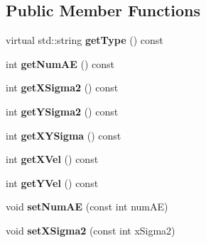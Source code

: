 \subsection*{Public Member Functions}
\begin{DoxyCompactItemize}
\item 
virtual std\+::string {\bfseries get\+Type} () const \hypertarget{classev_1_1ClusterEventGauss_a1df2453e17843cfce7d83fcb18f6dd0f}{}\label{classev_1_1ClusterEventGauss_a1df2453e17843cfce7d83fcb18f6dd0f}

\item 
int {\bfseries get\+Num\+AE} () const \hypertarget{classev_1_1ClusterEventGauss_a3e2d06634450fb40294c6c826d88dad6}{}\label{classev_1_1ClusterEventGauss_a3e2d06634450fb40294c6c826d88dad6}

\item 
int {\bfseries get\+X\+Sigma2} () const \hypertarget{classev_1_1ClusterEventGauss_aa4898a9304cbf6ed5c3d8883473e9fbf}{}\label{classev_1_1ClusterEventGauss_aa4898a9304cbf6ed5c3d8883473e9fbf}

\item 
int {\bfseries get\+Y\+Sigma2} () const \hypertarget{classev_1_1ClusterEventGauss_ade45d25fe8cd39623bb5f330ae012e6e}{}\label{classev_1_1ClusterEventGauss_ade45d25fe8cd39623bb5f330ae012e6e}

\item 
int {\bfseries get\+X\+Y\+Sigma} () const \hypertarget{classev_1_1ClusterEventGauss_a267d0eb2a46834de84dadd274a08521f}{}\label{classev_1_1ClusterEventGauss_a267d0eb2a46834de84dadd274a08521f}

\item 
int {\bfseries get\+X\+Vel} () const \hypertarget{classev_1_1ClusterEventGauss_a6278b2c5095948a499cb59aa07d79ab0}{}\label{classev_1_1ClusterEventGauss_a6278b2c5095948a499cb59aa07d79ab0}

\item 
int {\bfseries get\+Y\+Vel} () const \hypertarget{classev_1_1ClusterEventGauss_a94dde2e9f7356331e3694b736f8984c7}{}\label{classev_1_1ClusterEventGauss_a94dde2e9f7356331e3694b736f8984c7}

\item 
void {\bfseries set\+Num\+AE} (const int num\+AE)\hypertarget{classev_1_1ClusterEventGauss_a4435e1378dc1431b812917ce0fd78930}{}\label{classev_1_1ClusterEventGauss_a4435e1378dc1431b812917ce0fd78930}

\item 
void {\bfseries set\+X\+Sigma2} (const int x\+Sigma2)\hypertarget{classev_1_1ClusterEventGauss_a14983a1a3c8f4e78f9761d5ed6ebde8d}{}\label{classev_1_1ClusterEventGauss_a14983a1a3c8f4e78f9761d5ed6ebde8d}


\end{DoxyCompactItemize}
